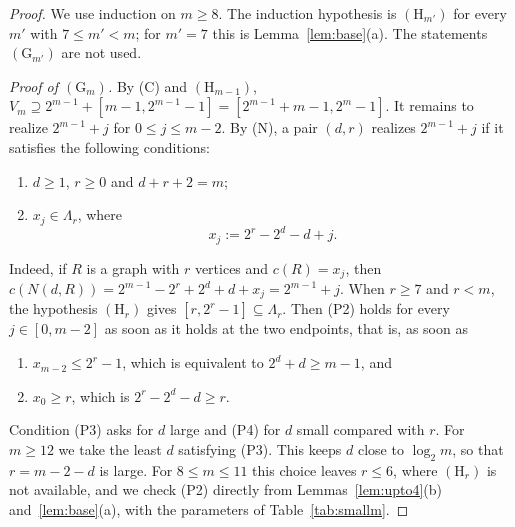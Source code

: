 \documentclass[11pt]{amsart}
\theoremstyle{definition}
\theoremstyle{remark}
\newcommand{\Lam}{\Lambda}
\begin{document}
\begin{proof}
We use induction on $m\ge8$. The induction hypothesis is $(\mathrm H_{m'})$ for every $m'$ with $7\le m'<m$; for $m'=7$ this is Lemma~\ref{lem:base}(a). The statements $(\mathrm G_{m'})$ are not used.

\emph{Proof of $(\mathrm G_m)$.} By (C) and $(\mathrm H_{m-1})$, $V_m\supseteq2^{m-1}+[m-1,2^{m-1}-1]=[2^{m-1}+m-1,2^m-1]$. It remains to realize $2^{m-1}+j$ for $0\le j\le m-2$. By (N), a pair $(d,r)$ realizes $2^{m-1}+j$ if it satisfies the following conditions:
\begin{enumerate}[label=\textup{(P\arabic*)}]
\item $d\ge1$, $r\ge0$ and $d+r+2=m$;
\item $x_j\in\Lam_r$, where
\begin{equation}\label{eq:need}
x_j:=2^r-2^d-d+j .
\end{equation}
\end{enumerate}
Indeed, if $R$ is a graph with $r$ vertices and $c(R)=x_j$, then $c(N(d,R))=2^{m-1}-2^r+2^d+d+x_j=2^{m-1}+j$. When $r\ge7$ and $r<m$, the hypothesis $(\mathrm H_r)$ gives $[r,2^r-1]\subseteq\Lam_r$. Then (P2) holds for every $j\in[0,m-2]$ as soon as it holds at the two endpoints, that is, as soon as
\begin{enumerate}[label=\textup{(P\arabic*)},start=3]
\item $x_{m-2}\le2^r-1$, which is equivalent to $2^d+d\ge m-1$, and
\item $x_0\ge r$, which is $2^r-2^d-d\ge r$.
\end{enumerate}
Condition (P3) asks for $d$ large and (P4) for $d$ small compared with $r$. For $m\ge12$ we take the least $d$ satisfying (P3). This keeps $d$ close to $\log_2m$, so that $r=m-2-d$ is large. For $8\le m\le11$ this choice leaves $r\le6$, where $(\mathrm H_r)$ is not available, and we check (P2) directly from Lemmas~\ref{lem:upto4}(b) and~\ref{lem:base}(a), with the parameters of Table~\ref{tab:smallm}.


\end{proof}
\end{document}
